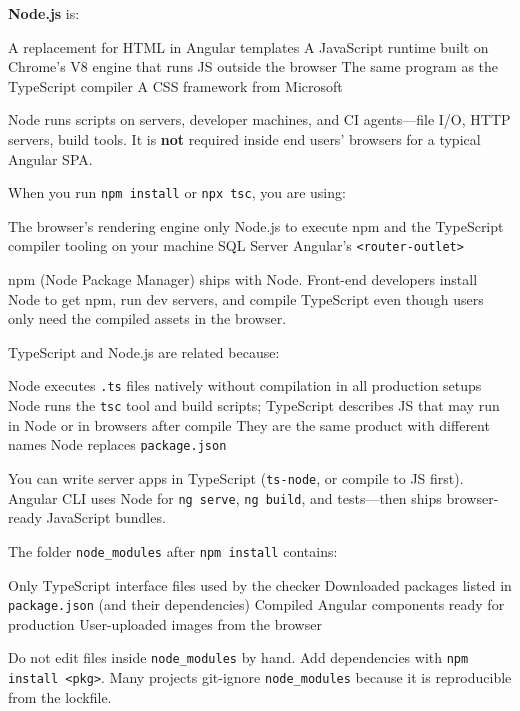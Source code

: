 \question[4]
\textbf{Node.js} is:
\begin{choices}
  \choice A replacement for HTML in Angular templates
  \CorrectChoice A JavaScript runtime built on Chrome's V8 engine that runs JS outside the browser
  \choice The same program as the TypeScript compiler
  \choice A CSS framework from Microsoft
\end{choices}
\begin{solution}
  Node runs scripts on servers, developer machines, and CI agents---file I/O, HTTP servers, build tools. It is \textbf{not} required inside end users' browsers for a typical Angular SPA.
\end{solution}

\question[4]
When you run \texttt{npm install} or \texttt{npx tsc}, you are using:
\begin{choices}
  \choice The browser's rendering engine only
  \CorrectChoice Node.js to execute npm and the TypeScript compiler tooling on your machine
  \choice SQL Server
  \choice Angular's \lstinline[style=htmlinline]|<router-outlet>|
\end{choices}
\begin{solution}
  npm (Node Package Manager) ships with Node. Front-end developers install Node to get npm, run dev servers, and compile TypeScript even though users only need the compiled assets in the browser.
\end{solution}

\question[4]
TypeScript and Node.js are related because:
\begin{choices}
  \choice Node executes \texttt{.ts} files natively without compilation in all production setups
  \CorrectChoice Node runs the \texttt{tsc} tool and build scripts; TypeScript describes JS that may run in Node or in browsers after compile
  \choice They are the same product with different names
  \choice Node replaces \texttt{package.json}
\end{choices}
\begin{solution}
  You can write server apps in TypeScript (\texttt{ts-node}, or compile to JS first). Angular CLI uses Node for \texttt{ng serve}, \texttt{ng build}, and tests---then ships browser-ready JavaScript bundles.
\end{solution}

\question[4]
The folder \texttt{node\_modules} after \texttt{npm install} contains:
\begin{choices}
  \choice Only TypeScript interface files used by the checker
  \CorrectChoice Downloaded packages listed in \texttt{package.json} (and their dependencies)
  \choice Compiled Angular components ready for production
  \choice User-uploaded images from the browser
\end{choices}
\begin{solution}
  Do not edit files inside \texttt{node\_modules} by hand. Add dependencies with \texttt{npm install <pkg>}. Many projects git-ignore \texttt{node\_modules} because it is reproducible from the lockfile.
\end{solution}

